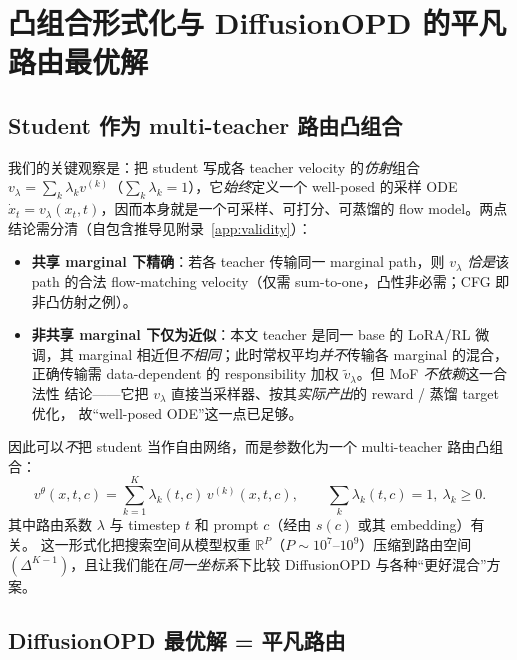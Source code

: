 \documentclass[11pt,a4paper]{article}
\newcommand{\R}{\mathbb{R}}
\newcommand{\stu}{\theta}
\theoremstyle{definition}
\begin{document}
\section{凸组合形式化与 DiffusionOPD 的平凡路由最优解}
\label{sec:convex}

\subsection{Student 作为 multi-teacher 路由凸组合}
\label{ssec:param}

我们的关键观察是：把 student 写成各 teacher velocity 的\emph{仿射}组合
$v_\lambda=\sum_k\lambda_k v^{(k)}$（$\sum_k\lambda_k=1$），它\emph{始终}定义一个 well-posed
的采样 ODE $\dot x_t=v_\lambda(x_t,t)$，因而本身就是一个可采样、可打分、可蒸馏的 flow
model。两点结论需分清（自包含推导见附录~\ref{app:validity}）：
\begin{itemize}[leftmargin=1.5em]
\item \textbf{共享 marginal 下精确}：若各 teacher 传输同一 marginal path，则 $v_\lambda$
\emph{恰是}该 path 的合法 flow-matching velocity（仅需 sum-to-one，凸性非必需；CFG 即
非凸仿射之例）。
\item \textbf{非共享 marginal 下仅为近似}：本文 teacher 是同一 base 的 LoRA/RL 微调，其
marginal 相近但\emph{不相同}；此时常权平均\emph{并不}传输各 marginal 的混合，正确传输需
data-dependent 的 responsibility 加权 $\tilde v_\lambda$。但 MoF \emph{不依赖}这一合法性
结论——它把 $v_\lambda$ 直接当采样器、按其\emph{实际产出}的 reward / 蒸馏 target 优化，
故``well-posed ODE''这一点已足够。
\end{itemize}
因此可以\emph{不}把
student 当作自由网络，而是参数化为一个 multi-teacher 路由凸组合：
\begin{equation}
\boxed{\,v^\stu(x,t,c)=\sum_{k=1}^K \lambda_k(t,c)\,v^{(k)}(x,t,c),\qquad
\sum_k\lambda_k(t,c)=1,\ \lambda_k\geq 0.\,}
\label{eq:param}
\end{equation}
其中路由系数 $\lambda$ 与 timestep $t$ 和 prompt $c$（经由 $s(c)$ 或其 embedding）有关。
这一形式化把搜索空间从模型权重 $\R^P$（$P\sim10^7$--$10^9$）压缩到路由空间
$(\Delta^{K-1})$，且让我们能在\emph{同一坐标系}下比较 DiffusionOPD 与各种``更好混合''方案。

\subsection{DiffusionOPD 最优解 = 平凡路由}
\label{ssec:trivial}
\end{document}
